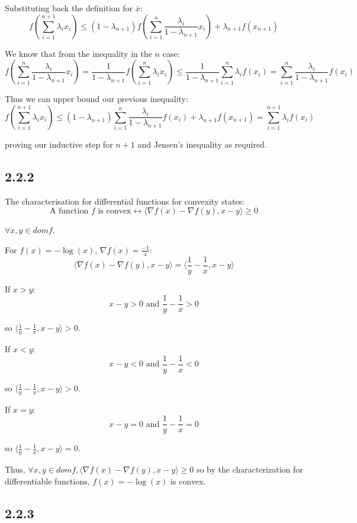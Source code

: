 \documentclass[12pt]{article}
\begin{document}
Substituting back the definition for $\bar{x}$:
\[f\left(\sum_{i=1}^{n+1} \lambda_i x_i\right) \leq (1-\lambda_{n+1}) f\left( \sum_{i=1}^n \frac{\lambda_i}{1-\lambda_{n+1}} x_i\right) + \lambda_{n+1} f\left( x_{n+1}\right)\]

We know that from the inequality in the $n$ case:
\[f\left( \sum_{i=1}^n \frac{\lambda_i}{1-\lambda_{n+1}} x_i\right) = \frac{1}{{1-\lambda_{n+1}}}f\left( \sum_{i=1}^n \lambda_i x_i\right) \leq \frac{1}{{1-\lambda_{n+1}}} \sum_{i=1}^n \lambda_i f \left(x_i\right) =  \sum_{i=1}^n \frac{\lambda_i}{{1-\lambda_{n+1}}}  f \left(x_i\right)\]

Thus we can upper bound our previous inequality:
\[f\left(\sum_{i=1}^{n+1} \lambda_i x_i\right)  \leq (1-\lambda_{n+1})\sum_{i=1}^n \frac{\lambda_i}{{1-\lambda_{n+1}}}  f \left(x_i\right) + \lambda_{n+1} f\left( x_{n+1}\right) =\sum_{i=1}^{n+1} \lambda_i f \left(x_i\right) \]

proving our inductive step for $n+1$ and Jensen's inequality as required. \square


\subsection*{2.2.2}
The characterisation for differential functions for convexity states:
\[\text{A function } f \text{ is convex} \leftrightarrow \langle \nabla f(x) - \nabla f(y), x-y \rangle \geq 0\]

$\forall x, y \in dom f$.

For $f(x) = -\log(x)$, $\nabla f(x) = \frac{-1}{x}$:
\[\langle \nabla f(x) - \nabla f(y), x-y \rangle = \langle \frac{1}{y}-\frac{1}{x}, x-y \rangle\]

If $x>y$:
\[x-y>0 \text{ and }\frac{1}{y} - \frac{1}{x} > 0\]

so $\langle \frac{1}{y}-\frac{1}{x}, x-y \rangle > 0$.

If $x<y$:
\[x-y<0 \text{ and }\frac{1}{y} - \frac{1}{x} < 0\]

so $\langle \frac{1}{y}-\frac{1}{x}, x-y \rangle > 0$.

If $x=y$:
\[x-y=0 \text{ and }\frac{1}{y} - \frac{1}{x} = 0\]

so $\langle \frac{1}{y}-\frac{1}{x}, x-y \rangle = 0$.

Thus, $\forall x, y \in dom f, \langle \nabla f(x) - \nabla f(y), x-y \rangle \geq 0$ so by the characterization for differentiable functions, $f(x) = -\log(x)$ is convex. \square

\subsection*{2.2.3}
\end{document}
